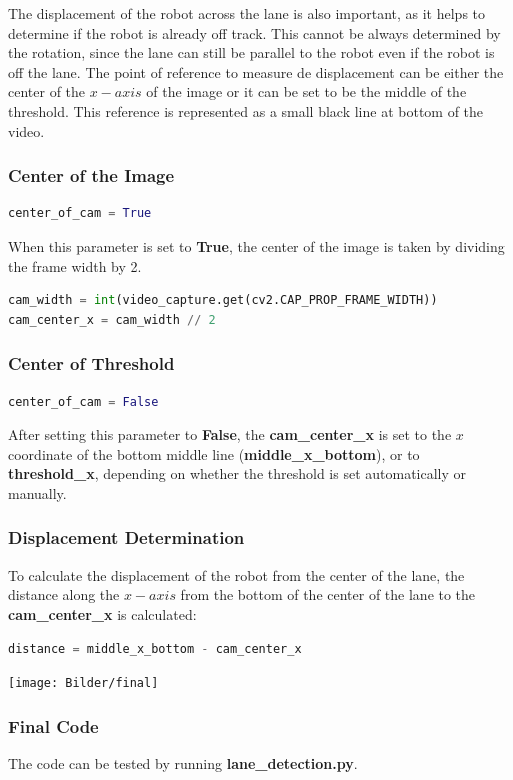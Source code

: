 \documentclass[12pt]{article}
\begin{document}
The displacement of the robot across the lane is also important, as it helps to determine if the robot is already off track. This cannot be always determined by the rotation, since the lane can still be parallel to the robot even if the robot is off the lane. The point of reference to measure de displacement can be either the center of the $x-axis$ of the image or it can be set to be the middle of the threshold. This reference is represented as a small black line at bottom of the video.
\subsubsection*{Center of the Image}
\begin{lstlisting}[language=Python]
center_of_cam = True
\end{lstlisting}

When this parameter is set to \textbf{True}, the center of the image is taken by dividing the frame width by 2. 
\begin{lstlisting}[language=Python]
cam_width = int(video_capture.get(cv2.CAP_PROP_FRAME_WIDTH))
cam_center_x = cam_width // 2
\end{lstlisting}
\subsubsection*{Center of Threshold}
\begin{lstlisting}[language=Python]
center_of_cam = False
\end{lstlisting}

After setting this parameter to \textbf{False}, the \textbf{cam\_center\_x} is set to the $x$ coordinate of the bottom middle line (\textbf{middle\_x\_bottom}), or to \textbf{threshold\_x}, depending on whether the threshold is set automatically or manually.
\subsubsection*{Displacement Determination}

To calculate the displacement of the robot from the center of the lane, the distance along the $x-axis$ from the bottom of the center of the lane to the \textbf{cam\_center\_x} is calculated:

\begin{lstlisting}[language=Python]
distance = middle_x_bottom - cam_center_x
\end{lstlisting}

\begin{center}
\texttt{[image: Bilder/final]}
\end{center}

\subsubsection*{Final Code}

The code can be tested by running \textbf{lane\_detection.py}. 
\end{document}
